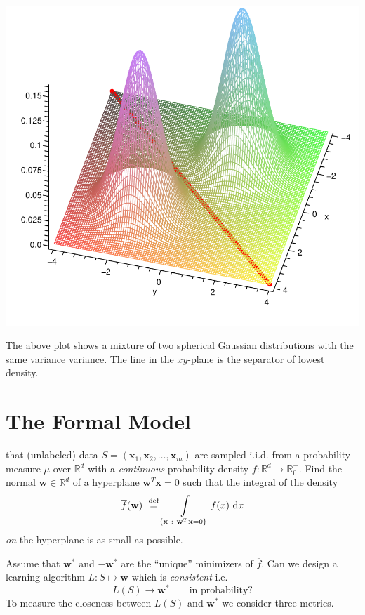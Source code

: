 \documentclass[largefonts,landscape]{sciposter}
\newcommand{\R}{\mathbb{R}}
\newcommand{\x}{\mathbf{x}}
\newcommand{\w}{\mathbf{w}}
\newcommand{\ud}{\mathrm{d}}
\begin{document}
\begin{multicols}{3}
\begin{center}
\includegraphics[width=33cm]{3dplot}
\end{center}

The above plot shows a mixture of two spherical Gaussian distributions with the same variance variance.
The line in the $xy$-plane is the separator of lowest density.

\columnbreak

\section*{The Formal Model}

 that (unlabeled) data $S=(\x_1, \x_2, \dots, \x_m)$ are sampled i.i.d. from a probability measure $\mu$ over $\R^d$
with a \emph{continuous} probability density $f:\R^d \to \R_0^+$. Find the normal $\w \in \R^d$ of a hyperplane $\w^T \x = 0$
such that the integral of the density
$$
\overline{f}(\w) \ \stackrel{\text{def}}{=} \int_{\{ \x ~:~ \w^T \x = 0 \}} \displaylimits f(x) \ \ud x
$$
\emph{on} the hyperplane is as small as possible.

Assume that $\w^*$ and $-\w^*$ are the ``unique'' minimizers of $\overline{f}$.
Can we design a learning algorithm $L:S \mapsto \w$ which is \emph{consistent} i.e. 
$$
L(S) \to \w^*  \qquad \text{in probability?}
$$
To measure the closeness between $L(S)$ and $\w^*$ we consider three metrics.


\end{multicols}
\end{document}
